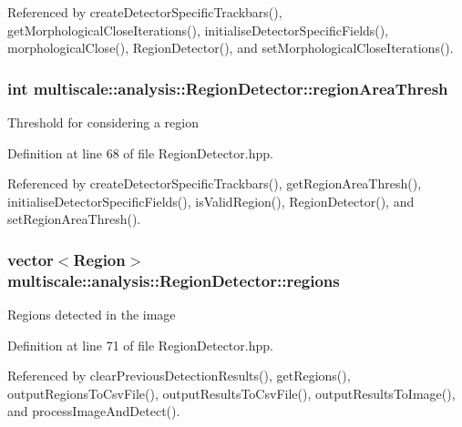 Referenced by create\-Detector\-Specific\-Trackbars(), get\-Morphological\-Close\-Iterations(), initialise\-Detector\-Specific\-Fields(), morphological\-Close(), Region\-Detector(), and set\-Morphological\-Close\-Iterations().

\hypertarget{classmultiscale_1_1analysis_1_1RegionDetector_a1f637073a3d946d000dceed01412f19a}{
\subsubsection[{region\-Area\-Thresh}]{\setlength{\rightskip}{0pt plus 5cm}int multiscale\-::analysis\-::\-Region\-Detector\-::region\-Area\-Thresh\hspace{0.3cm}{\ttfamily [private]}}}\label{classmultiscale_1_1analysis_1_1RegionDetector_a1f637073a3d946d000dceed01412f19a}
Threshold for considering a region 

Definition at line 68 of file Region\-Detector.\-hpp.



Referenced by create\-Detector\-Specific\-Trackbars(), get\-Region\-Area\-Thresh(), initialise\-Detector\-Specific\-Fields(), is\-Valid\-Region(), Region\-Detector(), and set\-Region\-Area\-Thresh().

\hypertarget{classmultiscale_1_1analysis_1_1RegionDetector_aa6517ceb3a58295448d32e6e41499893}{
\subsubsection[{regions}]{\setlength{\rightskip}{0pt plus 5cm}vector$<${\bf Region}$>$ multiscale\-::analysis\-::\-Region\-Detector\-::regions\hspace{0.3cm}{\ttfamily [private]}}}\label{classmultiscale_1_1analysis_1_1RegionDetector_aa6517ceb3a58295448d32e6e41499893}
Regions detected in the image 

Definition at line 71 of file Region\-Detector.\-hpp.



Referenced by clear\-Previous\-Detection\-Results(), get\-Regions(), output\-Regions\-To\-Csv\-File(), output\-Results\-To\-Csv\-File(), output\-Results\-To\-Image(), and process\-Image\-And\-Detect().

